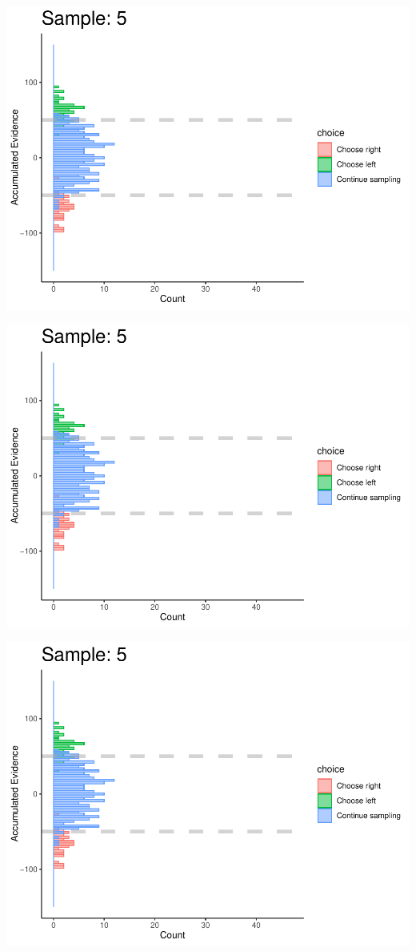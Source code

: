 \documentclass[
]{book}
\begin{document}
\begin{center}\includegraphics[width=0.8\linewidth]{LateNightBayes_files/figure-latex/fixed_check-43} \end{center}

\begin{center}\includegraphics[width=0.8\linewidth]{LateNightBayes_files/figure-latex/fixed_check-44} \end{center}

\begin{center}\includegraphics[width=0.8\linewidth]{LateNightBayes_files/figure-latex/fixed_check-45} \end{center}
\end{document}
